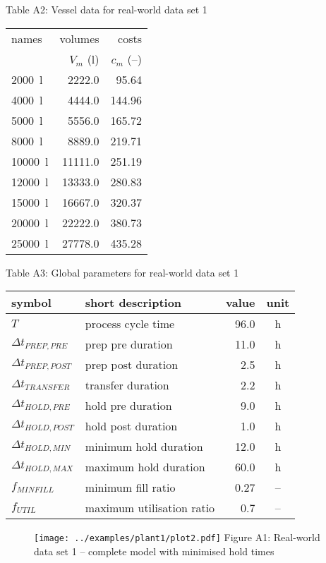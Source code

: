 \begin{table}[h]
    \centering Table A2: Vessel data for real-world data set 1\\
    \label{tbl.vessel1}
    \begin{tabular}{l | r | r}
        names & volumes & costs\\
        & $V_{m}$ (l) & $c_{m}$ (--)\\\hline
        \SI{2000}{\litre} & \SI{2222.0}{} & \SI{95.64}{}\\
        \SI{4000}{\litre} & \SI{4444.0}{} & \SI{144.96}{}\\
        \SI{5000}{\litre} & \SI{5556.0}{} & \SI{165.72}{}\\
        \SI{8000}{\litre} & \SI{8889.0}{} & \SI{219.71}{}\\
        \SI{10000}{\litre} & \SI{11111.0}{} & \SI{251.19}{}\\
        \SI{12000}{\litre} & \SI{13333.0}{} & \SI{280.83}{}\\
        \SI{15000}{\litre} & \SI{16667.0}{} & \SI{320.37}{}\\
        \SI{20000}{\litre} & \SI{22222.0}{} & \SI{380.73}{}\\
        \SI{25000}{\litre} & \SI{27778.0}{} & \SI{435.28}{}\\
    \end{tabular}
\end{table}

\begin{table}[h!]
    \centering Table A3: Global parameters for real-world data set 1
    \label{tbl.parameters1}
    \begin{tabular}{l | l | r | c}
        symbol & short description & value & unit\\ \hline
        $T$ & process cycle time & 96.0 & h\\
        $\Delta t_{\mathit{PREP,PRE}}$ & prep pre duration & 11.0 & h\\
        $\Delta t_{\mathit{PREP,POST}}$ & prep post duration & 2.5 & h\\
        $\Delta t_{\mathit{TRANSFER}}$ & transfer duration & 2.2 & h\\
        $\Delta t_{\mathit{HOLD,PRE}}$ & hold pre duration & 9.0 & h\\
        $\Delta t_{\mathit{HOLD,POST}}$ & hold post duration & 1.0 & h\\
        $\Delta t_{\mathit{HOLD,MIN}}$ & minimum hold duration & 12.0 & h\\
        $\Delta t_{\mathit{HOLD,MAX}}$ & maximum hold duration & 60.0 & h\\
        $f_{\mathit{MINFILL}}$ & minimum fill ratio & 0.27 & --\\
        $f_{\mathit{UTIL}}$ & maximum utilisation ratio & 0.7 & --\\
    \end{tabular}
\end{table}

\begin{figure}[h]
    \centering
    \texttt{[image: ../examples/plant1/plot2.pdf]}
    Figure A1: Real-world data set 1 -- complete model with minimised
        hold times
    \label{fig.secondary1}
\end{figure}
